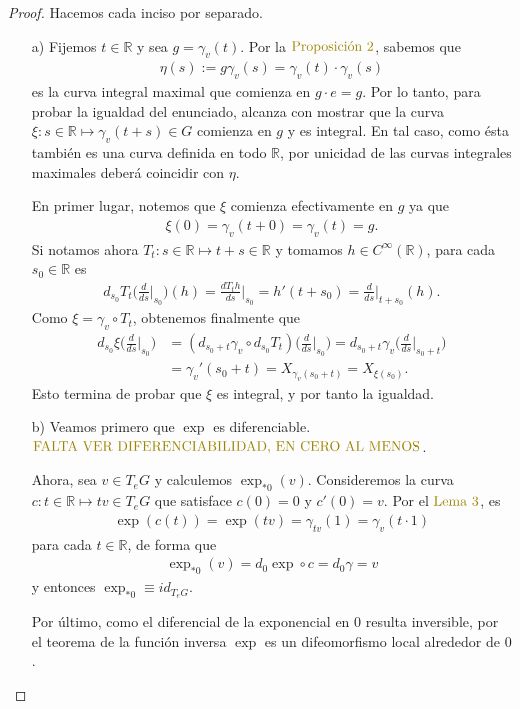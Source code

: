 \documentclass[11pt]{article}
\newcommand{\R}{\mathbb{R}}
\newcommand{\paint}[1]{\color{color}{#1}}
\begin{document}
\begin{proof} Hacemos cada inciso por separado.
\begin{itemize}
\item[a)] Fijemos $t \in \R$ y sea $g = \gamma_v(t)$. Por la $\paint{\text{Proposici\'on $2$}}$, sabemos que
\begin{align*}
\eta(s) := g \gamma_v(s) = \gamma_v(t) \cdot \gamma_v(s)
\end{align*}
es la curva integral maximal que comienza en $g\cdot e  = g$. Por lo tanto, para probar la igualdad del enunciado, alcanza con mostrar que la curva $\xi : s \in \R \mapsto \gamma_v(t+s) \in G$ comienza en $g$ y es integral. En tal caso, como \'esta tambi\'en es una curva definida en todo $\R$, por unicidad de las curvas integrales maximales deber\'a coincidir con $\eta$. 

En primer lugar, notemos que $\xi$ comienza efectivamente en $g$ ya que
\begin{align*}
\xi(0) = \gamma_v(t+0) = \gamma_v(t) = g.
\end{align*}
Si notamos ahora $T_t : s \in \R \mapsto t+s \in \R$ y tomamos $h \in C^\infty(\R)$, para cada $s_0 \in \R$ es
\begin{align*}
d_{s_0}T_t\Big(\frac{d}{ds}\Big|_{s_0}\Big)(h) = \frac{dT_th}{ds}\Big|_{s_0} = h'(t+s_0) =  \frac{d}{ds}\Big|_{t+s_0}(h).
\end{align*}
Como $\xi = \gamma_v \circ T_t$, obtenemos finalmente que
\begin{align*}
d_{s_0}\xi\Big(\frac{d}{ds}\Big|_{s_0}\Big) &= (d_{s_0+t}\gamma_v  \circ d_{s_0} T_t)\Big(\frac{d}{ds}\Big|_{s_0}\Big)= d_{s_0+t}\gamma_v\Big(\frac{d}{ds}\Big|_{s_0+t}\Big)\\
&= \gamma_v'(s_0+t) = X_{\gamma_v(s_0+t)} = X_{\xi(s_0)}.
\end{align*}
Esto termina de probar que $\xi$ es integral, y por tanto la igualdad.
\item[b)] Veamos primero que $\exp$ es diferenciable. $\paint{\text{FALTA VER DIFERENCIABILIDAD, EN CERO AL MENOS}}$.

Ahora, sea $v \in T_eG$ y calculemos $\exp_{\ast 0}(v)$. Consideremos la curva $c : t \in \R \mapsto tv \in T_eG$ que satisface $c(0) = 0$ y $c'(0) = v$. Por el $\paint{\text{Lema $3$}}$, es
\begin{align*}
\exp(c(t)) = \exp(tv) = \gamma_{tv}(1) = \gamma_{v}(t \cdot 1)
\end{align*}
para cada $t \in \R$, de forma que
\begin{align*}
\exp_{*0}(v) = d_0\exp \circ c = d_0\gamma = v 
\end{align*}
y entonces $\exp_{*0} \equiv id_{T_eG}$. 

Por \'ultimo, como el diferencial de la exponencial en $0$ resulta inversible, por el teorema de la funci\'on inversa $\exp$ es un difeomorfismo local alrededor de $0$.
\end{itemize}
\end{proof}
\end{document}
